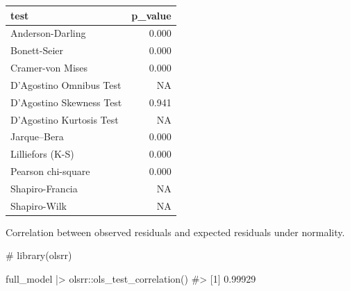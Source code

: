 \documentclass[
  12pt,
  a4paper,
  oneside]{tesesusp}
\newenvironment{Shaded}{\begin{snugshade}}{\end{snugshade}}
\newcommand{\CommentTok}[1]{\textcolor[rgb]{0.37,0.37,0.37}{#1}}
\newcommand{\FunctionTok}[1]{\textcolor[rgb]{0.28,0.35,0.67}{#1}}
\newcommand{\NormalTok}[1]{\textcolor[rgb]{0.00,0.23,0.31}{#1}}
\newcommand{\SpecialCharTok}[1]{\textcolor[rgb]{0.37,0.37,0.37}{#1}}
\begin{document}
\begin{table}
\centering
\begin{tabular}{l|r}
\hline
test & p\_value\\
\hline
Anderson-Darling & 0.000\\
\hline
Bonett-Seier & 0.000\\
\hline
Cramer-von Mises & 0.000\\
\hline
D'Agostino Omnibus Test & NA\\
\hline
D'Agostino Skewness Test & 0.941\\
\hline
D'Agostino Kurtosis Test & NA\\
\hline
Jarque–Bera & 0.000\\
\hline
Lilliefors (K-S) & 0.000\\
\hline
Pearson chi-square & 0.000\\
\hline
Shapiro-Francia & NA\\
\hline
Shapiro-Wilk & NA\\
\hline
\end{tabular}
\end{table}

Correlation between observed residuals and expected residuals under
normality.

\begin{Shaded}
\begin{Highlighting}[numbers=left,,]
\CommentTok{\# library(olsrr)}

\NormalTok{full\_model }\SpecialCharTok{|\textgreater{}}\NormalTok{ olsrr}\SpecialCharTok{::}\FunctionTok{ols\_test\_correlation}\NormalTok{()}
\CommentTok{\#\textgreater{} [1] 0.99929}
\end{Highlighting}
\end{Shaded}
\end{document}
